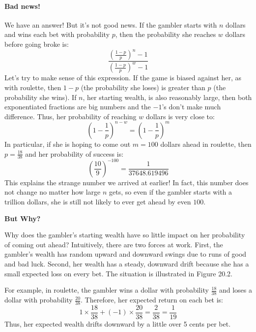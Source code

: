 \documentclass[12pt,a4paper]{article}
\begin{document}
		\paragraph{Bad news!}
		We have an answer! But it's not good news. If the gambler starts with $n$ dollars and wins each bet with probability $p$, then the probability she reaches $w$ dollars before going broke is:
		\[
		\frac{\left( \frac{1-p}{p} \right)^n-1}{\left(\frac{1-p}{p} \right)^w-1}
		\]
		Let's try to make sense of this expression. If the game is biased against her, as with roulette, then $1 - p$ (the probability she loses) is greater than $p$ (the probability she wins). If $n$, her starting wealth, is also reasonably large, then both exponentiated fractions are big numbers and the $-1$'s don't make much difference. Thus, her probability of reaching $w$ dollars is very close to:
		\[
		\left( 1 - \frac{1}{p} \right)^{n-w} = \left( 1 - \frac{1}{p} \right)^m
		\]
		In particular, if she is hoping to come out $m = 100$ dollars ahead in roulette, then $p = \frac{18}{38}$ and her probability of success is:
		\[
		\left( \frac{10}{9} \right)^{-100} = \frac{1}{37648.619496}
		\]
		This explains the strange number we arrived at earlier! In fact, this number does not change no matter how large $n$ gets, so even if the gambler starts with a trillion dollars, she is still not likely to ever get ahead by even $100$.
		
		\textbf{But Why?}
		
		Why does the gambler's starting wealth have so little impact on her probability of coming out ahead? Intuitively, there are two forces at work. First, the gambler's wealth has random upward and downward swings due to runs of good and bad luck. Second, her wealth has a steady, downward drift because she has a small expected loss on every bet. The situation is illustrated in Figure 20.2.
		
		
		For example, in roulette, the gambler wins a dollar with probability $\frac{18}{38}$ and loses a dollar with probability $\frac{20}{38}$. Therefore, her expected return on each bet is:
		\[
		1 \times \frac{18}{38} + (-1) \times \frac{20}{38} = \frac{2}{38} = \frac{1}{19}
		\]
		Thus, her expected wealth drifts downward by a little over 5 cents per bet.
		
\end{document}
